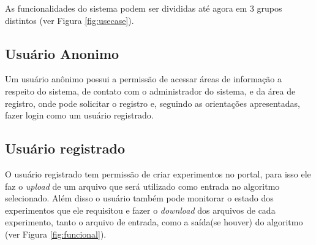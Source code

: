 \documentclass[tg]{mdtufsm}
\begin{document}
As funcionalidades do sistema podem ser divididas até agora em 3 grupos distintos (ver Figura \ref{fig:usecase}).
\subsection{Usuário Anonimo}
Um usuário anônimo possui a permissão de acessar áreas de informação a respeito do sistema, de contato com o administrador do sistema, e da área de registro, onde pode solicitar o registro e, seguindo as orientações apresentadas, fazer login como um usuário registrado.
\subsection{Usuário registrado}
O usuário registrado tem permissão de criar experimentos no portal, para isso ele faz o \emph{upload} de um arquivo que será utilizado como entrada no algoritmo selecionado. Além disso o usuário também pode monitorar o estado dos experimentos que ele requisitou e fazer o \emph{download} dos arquivos de cada experimento, tanto o arquivo de entrada, como a saída(se houver) do algoritmo (ver Figura \ref{fig:funcional}).
\end{document}
